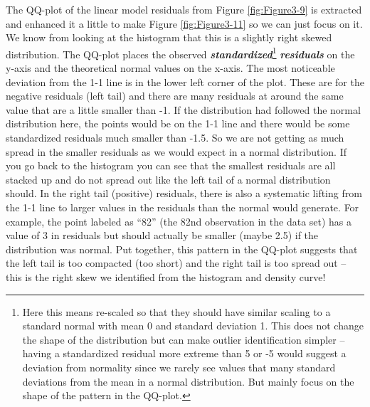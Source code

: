 \documentclass[]{book}
\let\rmarkdownfootnote\footnote%
\def\footnote{\protect\rmarkdownfootnote}
\begin{document}
The QQ-plot of the linear model residuals from Figure
\ref{fig:Figure3-9} is extracted and enhanced it a little to make Figure
\ref{fig:Figure3-11} so we can just focus on it. We know from looking at
the histogram that this is a slightly right skewed distribution. The
QQ-plot places the observed \textbf{\emph{standardized}}\footnote{Here
  this means re-scaled so that they should have similar scaling to a
  standard normal with mean 0 and standard deviation 1. This does not
  change the shape of the distribution but can make outlier
  identification simpler -- having a standardized residual more extreme
  than 5 or -5 would suggest a deviation from normality since we rarely
  see values that many standard deviations from the mean in a normal
  distribution. But mainly focus on the shape of the pattern in the
  QQ-plot.} \textbf{\emph{residuals}} on the y-axis and the theoretical
normal values on the x-axis. The most noticeable deviation from the 1-1
line is in the lower left corner of the plot. These are for the negative
residuals (left tail) and there are many residuals at around the same
value that are a little smaller than -1. If the distribution had
followed the normal distribution here, the points would be on the 1-1
line and there would be some standardized residuals much smaller than
-1.5. So we are not getting as much spread in the smaller residuals as
we would expect in a normal distribution. If you go back to the
histogram you can see that the smallest residuals are all stacked up and
do not spread out like the left tail of a normal distribution should. In
the right tail (positive) residuals, there is also a systematic lifting
from the 1-1 line to larger values in the residuals than the normal
would generate. For example, the point labeled as ``82'' (the 82nd
observation in the data set) has a value of 3 in residuals but should
actually be smaller (maybe 2.5) if the distribution was normal. Put
together, this pattern in the QQ-plot suggests that the left tail is too
compacted (too short) and the right tail is too spread out -- this is
the right skew we identified from the histogram and density curve!
\end{document}
